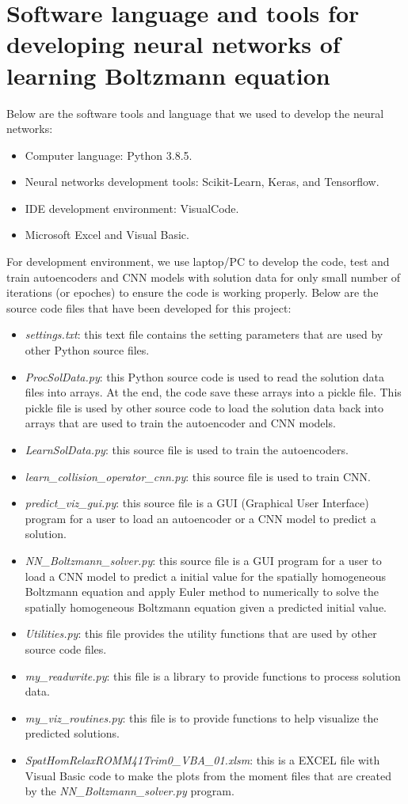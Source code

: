 \documentclass{article}
\begin{document}
\section{Software language and tools for developing neural networks of learning Boltzmann equation}
Below are the software tools and language that we used to develop the neural networks:
\begin{itemize}
	\item Computer language: Python 3.8.5.
	\item Neural networks development tools: Scikit-Learn, Keras, and Tensorflow.
	\item IDE development environment: VisualCode.
	\item Microsoft Excel and Visual Basic.
\end{itemize}
For development environment, we use laptop/PC to develop the code, test and train autoencoders and CNN models with solution data for only small number of iterations (or epoches) to ensure the code is working properly. Below are the source code files that have been developed for this project:
\begin{itemize}
	\item \emph{settings.txt}: this text file contains the setting parameters that are used by other Python source files.
	\item \emph{ProcSolData.py}: this Python source code is used to read the solution data files into arrays. At the end, the code save these arrays into a pickle file. This pickle file is used by other source code to load the solution data back into arrays that are used to train the autoencoder and CNN models.
	\item \emph{LearnSolData.py}: this source file is used to train the autoencoders.
	\item \emph{learn\_collision\_operator\_cnn.py}: this source file is used to train CNN.
	\item \emph{predict\_viz\_gui.py}: this source file is a GUI (Graphical User Interface) program for a user to load an autoencoder or a CNN model to predict a solution.
	\item \emph{NN\_Boltzmann\_solver.py}: this source file is a GUI program for a user to load a CNN model to predict a initial value for the spatially homogeneous Boltzmann equation and apply Euler method to numerically to solve the spatially homogeneous Boltzmann equation given a predicted initial value.
	\item \emph{Utilities.py}: this file provides the utility functions that are used by other source code files.
	\item \emph{my\_readwrite.py}: this file is a library to provide functions to process solution data.
	\item \emph{my\_viz\_routines.py}: this file is to provide functions to help visualize the predicted solutions.	
	\item \emph{SpatHomRelaxROMM41Trim0\_VBA\_01.xlsm}: this is a EXCEL file with Visual Basic code to make the plots from the moment files that are created by the \emph{NN\_Boltzmann\_solver.py} program.
\end{itemize}
\end{document}
